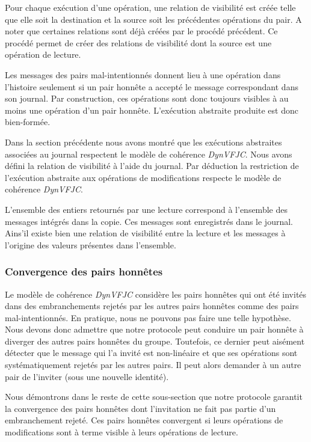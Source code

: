 Pour chaque exécution d'une opération, une relation de visibilité est créée telle que elle soit la destination et la source soit les précédentes opérations du pair.
A noter que certaines relations sont déjà créées par le procédé précédent.
Ce procédé permet de créer des relations de visibilité dont la source est une opération de lecture. 

Les messages des pairs mal-intentionnés donnent lieu à une opération dans l'histoire seulement si un pair honnête a accepté le message correspondant dans son journal.
Par construction, ces opérations sont donc toujours visibles à au moins une opération d'un pair honnête.
L'exécution abstraite produite est donc bien-formée.

Dans la section précédente nous avons montré que les exécutions abstraites associées au journal respectent le modèle de cohérence \emph{DynVFJC}.
Nous avons défini la relation de visibilité à l'aide du journal.
Par déduction la restriction de l'exécution abstraite aux opérations de modifications respecte le modèle de cohérence \emph{DynVFJC}.

L'ensemble des entiers retournés par une lecture correspond à l'ensemble des messages intégrés dans la copie. Ces messages sont enregistrés dans le journal.
Ains'il existe bien une relation de visibilité entre la lecture et les messages à l'origine des valeurs présentes dans l'ensemble.

\subsubsection{Convergence des pairs honnêtes}

Le modèle de cohérence \emph{DynVFJC} considère les pairs honnêtes qui ont été invités dans des embranchements rejetés par les autres pairs honnêtes comme des pairs mal-intentionnés.
En pratique, nous ne pouvons pas faire une telle hypothèse.
Nous devons donc admettre que notre protocole peut conduire un pair honnête à diverger des autres pairs honnêtes du groupe.
Toutefois, ce dernier peut aisément détecter que le message qui l'a invité est non-linéaire et que ses opérations sont systématiquement rejetés par les autres pairs.
Il peut alors demander à un autre pair de l'inviter (sous une nouvelle identité).

Nous démontrons dans le reste de cette sous-section que notre protocole garantit la convergence des pairs honnêtes dont l'invitation ne fait pas partie d'un embranchement rejeté.
Ces pairs honnêtes convergent si leurs opérations de modifications sont à terme visible à leurs opérations de lecture.


